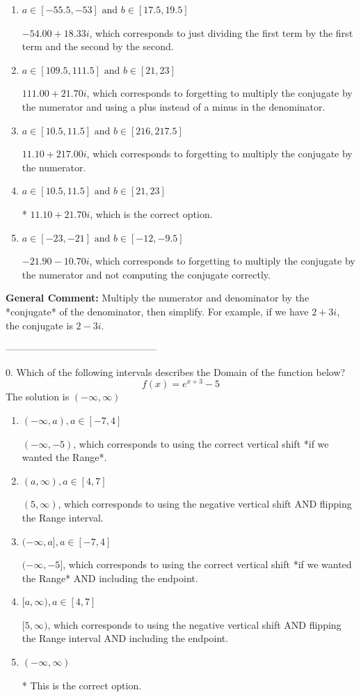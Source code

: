 \documentclass{extbook}[14pt]
\begin{document}
\begin{enumerate}[label=\Alph*.] 
\item $ a \in [-55.5, -53] \text{ and } b \in [17.5, 19.5] $ 

  $-54.00  + 18.33 i$, which corresponds to just dividing the first term by the first term and the second by the second. 
\item $ a \in [109.5, 111.5] \text{ and } b \in [21, 23] $ 

  $111.00  + 21.70 i$, which corresponds to forgetting to multiply the conjugate by the numerator and using a plus instead of a minus in the denominator. 
\item $ a \in [10.5, 11.5] \text{ and } b \in [216, 217.5] $ 

  $11.10  + 217.00 i$, which corresponds to forgetting to multiply the conjugate by the numerator. 
\item $ a \in [10.5, 11.5] \text{ and } b \in [21, 23] $ 

 * $11.10  + 21.70 i$, which is the correct option. 
\item $ a \in [-23, -21] \text{ and } b \in [-12, -9.5] $ 

  $-21.90  - 10.70 i$, which corresponds to forgetting to multiply the conjugate by the numerator and not computing the conjugate correctly. 
\end{enumerate} 
 
\textbf{General Comment:} Multiply the numerator and denominator by the *conjugate* of the denominator, then simplify. For example, if we have $2+3i$, the conjugate is $2-3i$. 

-----------------------------------------------

0. Which of the following intervals describes the Domain of the function below?
\[ f(x) = e^{x+3}-5 \] 
The solution is $ (-\infty, \infty) $ 

\begin{enumerate}[label=\Alph*.] 
\item $ (-\infty, a), a \in [-7, 4] $ 

 $(-\infty, -5)$, which corresponds to using the correct vertical shift *if we wanted the Range*. 
\item $ (a, \infty), a \in [4, 7] $ 

 $(5, \infty)$, which corresponds to using the negative vertical shift AND flipping the Range interval. 
\item $ (-\infty, a], a \in [-7, 4] $ 

 $(-\infty, -5]$, which corresponds to using the correct vertical shift *if we wanted the Range* AND including the endpoint. 
\item $ [a, \infty), a \in [4, 7] $ 

 $[5, \infty)$, which corresponds to using the negative vertical shift AND flipping the Range interval AND including the endpoint. 
\item $ (-\infty, \infty) $ 

 * This is the correct option. 
\end{enumerate} 
 
\end{document}
